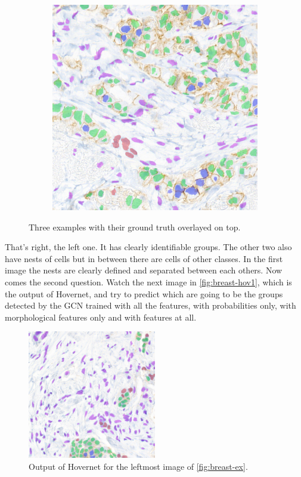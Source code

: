 \begin{figure}[H]
\begin{subfigure}[b]{0.3\textwidth}
    \label{fig:breast-gt2}
  \end{subfigure}
  \begin{subfigure}[b]{0.3\textwidth}
    \includegraphics[width=\textwidth]{imgs/qual/breast/gt3.overlay.png}
    \label{fig:breast-gt3}
  \end{subfigure}
    \caption{Three examples with their ground truth overlayed on top.}
    \label{fig:breast-ex}
\end{figure}

That's right, the left one. It has clearly identifiable groups. The other two also have nests of cells but in between there are cells of other classes. In the first image the nests are clearly defined and separated between each others. Now comes the second question. Watch the next image in \autoref{fig:breast-hov1}, which is the output of Hovernet, and try to predict which are going to be the groups detected by the GCN trained with all the features, with probabilities only, with morphological features only and with features at all.

\begin{figure}[H]
    \centering
    \includegraphics[width=0.5\textwidth]{imgs/qual/breast/hov1.png}
    \caption{Output of Hovernet for the leftmost image of \autoref{fig:breast-ex}.}
    \label{fig:breast-hov1}
\end{figure}

